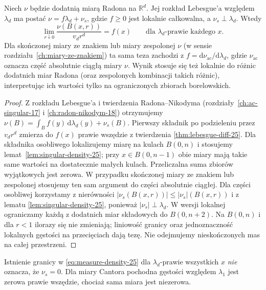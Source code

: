 \begin{twierdzenie}
\label{thm:measure-differentiation-25}
Niech $\nu$ będzie dodatnią miarą Radona na
$\mathbb R^d$. Jej rozkład Lebesgue'a względem
$\lambda_d$ ma postać $\nu=f\lambda_d+\nu_s$,
gdzie $f\ge0$ jest lokalnie całkowalna, a
$\nu_s\perp\lambda_d$. Wtedy
\begin{equation}\label{eq:measure-density-25}
 \lim_{r\downarrow0}\frac{\nu(B(x,r))}{v_dr^d}
 =f(x)\qquad\text{dla }\lambda_d\text{-prawie każdego }x.
\end{equation}
Dla skończonej miary ze znakiem lub miary zespolonej
$\nu$ (w sensie rozdziału~\ref{ch:miary-ze-znakiem})
ta sama teza zachodzi z
$f=\mathrm d\nu_{\mathrm{ac}}/\mathrm d\lambda_d$,
gdzie $\nu_{\mathrm{ac}}$ oznacza część absolutnie ciągłą
miary $\nu$. Wynik stosuje się też lokalnie do różnic
dodatnich miar Radona (oraz zespolonych kombinacji takich
różnic), interpretując ich wartości tylko na ograniczonych
zbiorach borelowskich.
\end{twierdzenie}
\begin{proof}
Z rozkładu Lebesgue'a i twierdzenia Radona--Nikodyma
(rozdziały~\ref{ch:ac-singular-17} i
\ref{ch:radon-nikodym-18}) otrzymujemy
$\nu(B)=\int_Bf(y)\,\mathrm d\lambda_d(y)+\nu_s(B)$.
Pierwszy składnik po podzieleniu przez $v_dr^d$
zmierza do $f(x)$ prawie wszędzie z twierdzenia
\ref{thm:lebesgue-diff-25}. Dla składnika osobliwego
lokalizujemy miarę na kulach $B(0,n)$ i stosujemy
lemat~\ref{lem:singular-density-25}; przy
$x\in B(0,n-1)$ obie miary mają takie same wartości
na dostatecznie małych kulach. Przeliczalna suma
zbiorów wyjątkowych jest zerowa. W przypadku skończonej miary ze znakiem lub zespolonej
stosujemy ten sam argument do części absolutnie ciągłej.
Dla części osobliwej korzystamy z nierówności
$|\nu_s(B(x,r))|\le|\nu_s|(B(x,r))$ i z lematu
\ref{lem:singular-density-25}, ponieważ
$|\nu_s|\perp\lambda_d$. W wersji lokalnej ograniczamy
każdą z dodatnich miar składowych do $B(0,n+2)$.
Na $B(0,n)$ i dla $r<1$ ilorazy się nie zmieniają;
liniowość granicy oraz jednoznaczność lokalnych gęstości
na przecięciach dają tezę. Nie odejmujemy nieskończonych
mas na całej przestrzeni.
\end{proof}

\begin{uwaga}
Istnienie granicy w \eqref{eq:measure-density-25} dla
$\lambda_d$-prawie wszystkich $x$ \emph{nie} oznacza,
że $\nu_s=0$. Dla miary Cantora pochodna gęstości
względem $\lambda_1$ jest zerowa prawie wszędzie,
chociaż sama miara jest niezerowa.
\end{uwaga}

